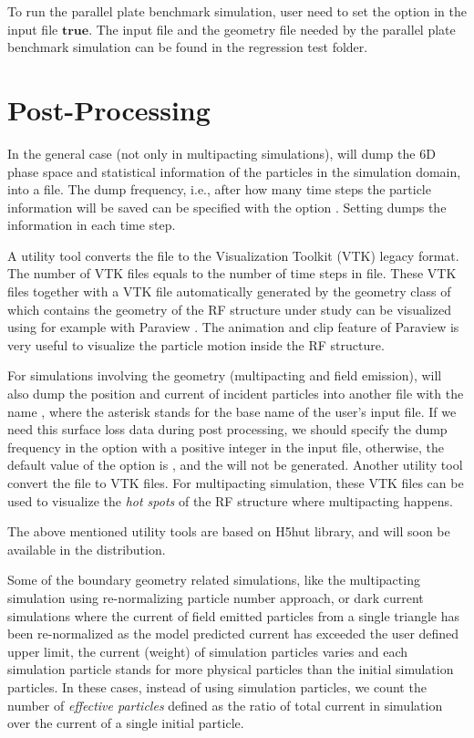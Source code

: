 To run the parallel plate benchmark simulation, user need to set the option  in the input file $\mathbf{true}$. The input file and the geometry file needed by the parallel plate benchmark simulation can be found in the regression test folder.
\clearpage
\section{Post-Processing}
\label{sec:PostProcessing}
In the general case (not only in multipacting simulations), \opal will dump the 6D phase space and statistical information of the particles in the simulation domain, into a  file. The dump frequency, i.e., after how many time steps the particle information will be saved can be specified with the option . Setting  dumps the information in each time step.

A utility tool   converts the  file to the Visualization Toolkit (VTK) legacy format. The number of VTK files equals to the number of time steps in  file. These VTK files together with a VTK file automatically generated by the geometry class of \opal which contains the geometry of the RF structure under study can be visualized using for example with Paraview \cite{paraview}. The animation and clip feature of Paraview is very useful to visualize the particle motion inside the RF structure.

For simulations involving the geometry (multipacting and field emission), \opal will also dump the position and current of incident particles into another  file with the name , where the asterisk stands for the base name of the user's \opal input file. If we need this surface loss data during post processing, we should specify the dump frequency in the option  with a positive integer in the \opal input file, otherwise, the default value of the option is , and the  will not be generated. Another utility tool   convert the   file to VTK files. For multipacting simulation, these VTK files can be used to visualize the \emph{hot spots} of the RF structure where multipacting happens.

The above mentioned utility tools are based on H5hut library, and will soon be available in the distribution.

Some of the boundary geometry related simulations, like the multipacting simulation using re-normalizing particle number approach, or dark current simulations where the current of field emitted particles from a single triangle has been re-normalized as the model predicted current has exceeded the user defined upper limit, the current (weight) of simulation particles varies and each simulation particle stands for more physical particles than the initial simulation particles. In these cases, instead of using simulation particles, we count the number of \emph{effective particles} defined as the ratio of total current in simulation over the current of a single initial particle.

